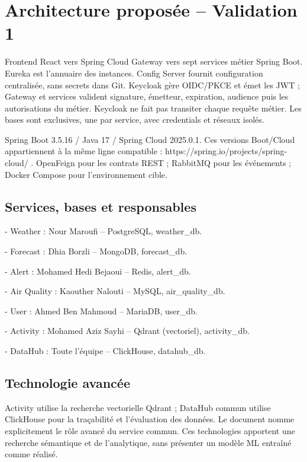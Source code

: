 \documentclass[10pt,a4paper]{article}
\begin{document}
\clearpage
\section*{Architecture proposée  --  Validation 1}

Frontend React  vers  Spring Cloud Gateway  vers  sept services métier Spring Boot. Eureka est l'annuaire des instances. Config Server fournit configuration centralisée, sans secrets dans Git. Keycloak gère OIDC/PKCE et émet les JWT ; Gateway et services valident signature, émetteur, expiration, audience puis les autorisations du métier. Keycloak ne fait pas transiter chaque requête métier. Les bases sont exclusives, une par service, avec credentials et réseaux isolés.\par

Spring Boot 3.5.16 / Java 17 / Spring Cloud 2025.0.1. Ces versions Boot/Cloud appartiennent à la même ligne compatible : https://spring.io/projects/spring-cloud/ . OpenFeign pour les contrats REST ; RabbitMQ pour les événements ; Docker Compose pour l'environnement cible.\par

\subsection*{Services, bases et responsables}

- Weather : Nour Maroufi  --  PostgreSQL, weather\_db.\par
- Forecast : Dhia Borzli  --  MongoDB, forecast\_db.\par
- Alert : Mohamed Hedi Bejaoui  --  Redis, alert\_db.\par
- Air Quality : Kaouther Nalouti  --  MySQL, air\_quality\_db.\par
- User : Ahmed Ben Mahmoud  --  MariaDB, user\_db.\par
- Activity : Mohamed Aziz Sayhi  --  Qdrant (vectoriel), activity\_db.\par
- DataHub : Toute l'équipe  --  ClickHouse, datahub\_db.\par

\subsection*{Technologie avancée}

Activity utilise la recherche vectorielle Qdrant ; DataHub commun utilise ClickHouse pour la traçabilité et l'évaluation des données. Le document nomme explicitement le rôle avancé du service commun. Ces technologies apportent une recherche sémantique et de l'analytique, sans présenter un modèle ML entraîné comme réalisé.\par
\end{document}
